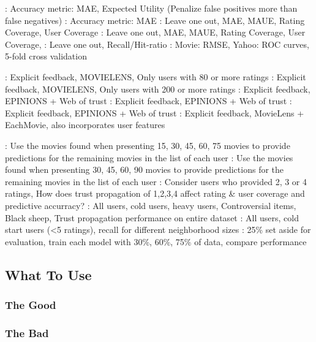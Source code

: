 
\cite{Rashid2008}: Accuracy metric: MAE, Expected Utility (Penalize false positives more than false negatives)
\cite{Rashid2002}: Accuracy metric: MAE
\cite{Massa2004}: Leave one out, MAE, MAUE, Rating Coverage, User Coverage
\cite{Massa2007}: Leave one out, MAE, MAUE, Rating Coverage, User Coverage,
\cite{Jamali2009}: Leave one out, Recall/Hit-ratio
\cite{Agarwal2009}: Movie: RMSE, Yahoo: ROC curves, 5-fold cross validation


\cite{Rashid2008}: Explicit feedback, MOVIELENS, Only users with 80 or more ratings
\cite{Rashid2002}: Explicit feedback, MOVIELENS, Only users with 200 or more ratings
\cite{Massa2004}: Explicit feedback, EPINIONS + Web of trust
\cite{Massa2007}: Explicit feedback, EPINIONS + Web of trust
\cite{Jamali2009}: Explicit feedback, EPINIONS + Web of trust
\cite{Agarwal2009}: Explicit feedback, MovieLens + EachMovie, also incorporates user features



\cite{Rashid2008}: Use the movies found when presenting 15, 30, 45, 60, 75 movies to provide predictions for the remaining movies in the list of each user
\cite{Rashid2002}: Use the movies found when presenting 30, 45, 60, 90 movies to provide predictions for the remaining movies in the list of each user
\cite{Massa2004}: Consider users who provided 2, 3 or 4 ratings, How does trust propagation of 1,2,3,4 affect rating \& user coverage and predictive accurracy?
\cite{Massa2007}: All users, cold users, heavy users, Controversial items, Black sheep, Trust propagation performance on entire dataset
\cite{Jamali2009}: All users, cold start users (<5 ratings), recall for different neighborhood sizes
\cite{Agarwal2009}: 25\% set aside for evaluation, train each model with 30\%, 60\%, 75\% of data, compare performance



\subsection{What To Use}


\subsubsection{The Good}


\subsubsection{The Bad}

